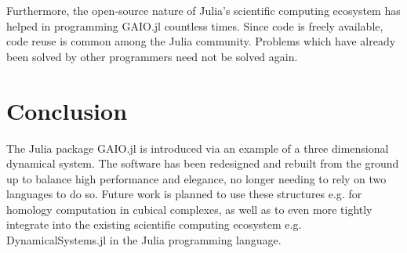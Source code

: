 \documentclass{juliacon}
\begin{document}
Furthermore, the open-source nature of Julia's scientific computing ecosystem has helped in programming GAIO.jl countless times. Since code is freely available, code reuse is common among the Julia community. Problems which have already been solved by other programmers need not be solved again. 

\section{Conclusion}

The Julia package GAIO.jl is introduced via an example of a three dimensional dynamical system. The software has been redesigned and rebuilt from the ground up to balance high performance and elegance, no longer needing to rely on two languages to do so. Future work is planned to use these structures e.g. for homology computation in cubical complexes, as well as to even more tightly integrate into the existing scientific computing ecosystem e.g. DynamicalSystems.jl \cite{dynamicalsystemsjl,dynamicalsystemsbook} in the Julia programming language. 


\end{document}
